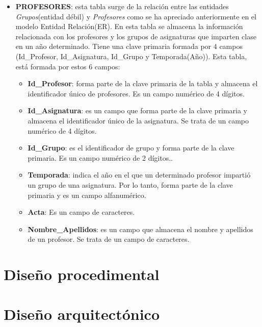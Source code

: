 \begin{itemize}
\item
\textbf{PROFESORES}: esta tabla surge de la relación entre las entidades \emph{Grupos}(entidad débil) y \emph{Profesores} como se ha apreciado anteriormente en el modelo Entidad Relación(ER). En esta tabla se almacena la información relacionada con los profesores y los grupos de asignaturas que imparten clase en un año determinado. Tiene una clave primaria formada por 4 campos (Id\_Profesor, Id\_Asignatura, Id\_Grupo y Temporada(Año)). Esta tabla, está formada por estos 6 campos:
\begin{itemize}
\item
\textbf{Id\_Profesor}: forma parte de la clave primaria de la tabla y almacena el identificador único de profesores. Es un campo numérico de 4 dígitos.
\item
\textbf{Id\_Asignatura}: es un campo que forma parte de la clave primaria y almacena el identificador único de la asignatura. Se trata de un campo numérico de 4 dígitos.
\item
\textbf{Id\_Grupo}: es el identificador de grupo y forma parte de la clave primaria. Es un campo numérico de 2 dígitos..
\item
\textbf{Temporada}: indica el año en el que un determinado profesor impartió un grupo de una asignatura. Por lo tanto, forma parte de la clave primaria y es un campo alfanumérico.
\item
\textbf{Acta}: Es un campo de caracteres.
\item
\textbf{Nombre\_Apellidos}: es un campo que almacena el nombre y apellidos de un profesor. Se trata de un campo de caracteres.
\end{itemize}


\newpage

\end{itemize}





\section{Diseño procedimental}

\section{Diseño arquitectónico}



